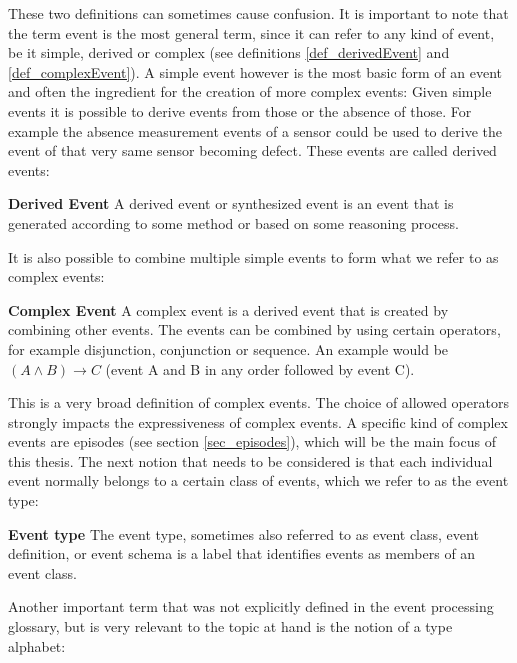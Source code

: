 These two definitions can sometimes cause confusion. It is important to note that the term event is the most general term, since it can refer to any kind of event, be it simple, derived or complex (see definitions \ref{def_derivedEvent} and \ref{def_complexEvent}). A simple event however is the most basic form of an event and often the ingredient for the creation of more complex events:
Given simple events it is possible to derive events from those or the absence of those. For example the absence measurement events of a sensor could be used to derive the event of that very same sensor becoming defect. These events are called derived events:

\begin{mydef}
\label{def_derivedEvent}
\textbf{Derived Event} A derived event or synthesized event is an event that is generated according to some method or based on some reasoning process.
\end{mydef}

It is also possible to combine multiple simple events to form what we refer to as complex events:

\begin{mydef}
\label{def_complexEvent}
\textbf{Complex Event} A complex event is a derived event that is created by combining other events. The events can be combined by using certain operators, for example disjunction, conjunction or sequence. An example would be $(A \land B) \rightarrow C$ (event A and B in any order followed by event C).
\end{mydef}

This is a very broad definition of complex events. The choice of allowed operators strongly impacts the expressiveness of complex events. A specific kind of complex events are episodes (see section \ref{sec_episodes}), which will be the main focus of this thesis.
The next notion that needs to be considered is that each individual event normally belongs to a certain class of events, which we refer to as the event type:

\begin{mydef}
\textbf{Event type} The event type, sometimes also referred to as event class, event definition, or event schema is a label that identifies events as members of an event class.
\end{mydef}

Another important term that was not explicitly defined in the event processing glossary, but is very relevant to the topic at hand is the notion of a type alphabet:

